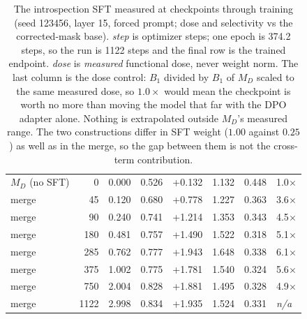 \begin{table}[h]
\begin{tabular}{lrrrrrrl}
$M_D$ (no SFT) & 0 & 0.000 & 0.526 & +0.132 & 1.132 & 0.448 & 1.0$\times$ \\
merge & 45 & 0.120 & 0.680 & +0.778 & 1.227 & 0.363 & 3.6$\times$ \\
merge & 90 & 0.240 & 0.741 & +1.214 & 1.353 & 0.343 & 4.5$\times$ \\
merge & 180 & 0.481 & 0.757 & +1.490 & 1.522 & 0.318 & 5.1$\times$ \\
merge & 285 & 0.762 & 0.777 & +1.943 & 1.648 & 0.338 & 6.1$\times$ \\
merge & 375 & 1.002 & 0.775 & +1.781 & 1.540 & 0.324 & 5.6$\times$ \\
merge & 750 & 2.004 & 0.828 & +1.881 & 1.495 & 0.328 & 4.9$\times$ \\
merge & 1122 & 2.998 & 0.834 & +1.935 & 1.524 & 0.331 & \textit{n/a} \\
\bottomrule
\end{tabular}
\caption{The introspection SFT measured at checkpoints through training (seed 123456, layer 15, forced prompt; dose and selectivity vs the corrected-mask base). \emph{step} is optimizer steps; one epoch is 374.2 steps, so the run is 1122 steps and the final row is the trained endpoint. \emph{dose} is \emph{measured} functional dose, never weight norm. The last column is the dose control: $B_1$ divided by $B_1$ of $M_D$ scaled to the same measured dose, so $1.0\times$ would mean the checkpoint is worth no more than moving the model that far with the DPO adapter alone. Nothing is extrapolated outside $M_D$'s measured range. The two constructions differ in SFT weight ($1.00$ against $0.25$) as well as in the merge, so the gap between them is not the cross-term contribution.}
\label{tab:oct-sft-curve}
\end{table}
